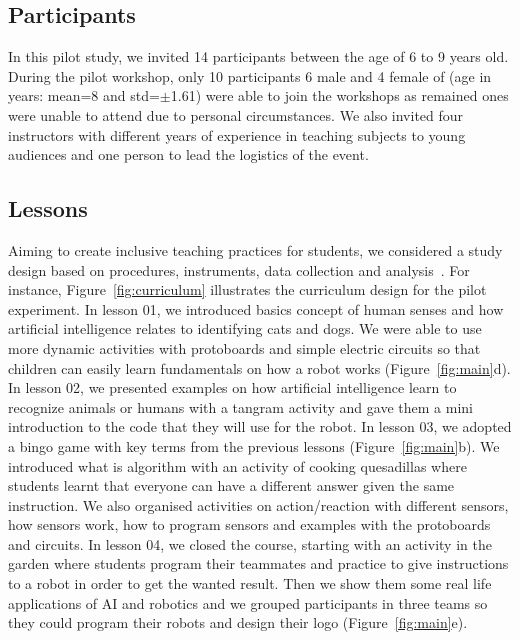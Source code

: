 \documentclass[sigconf,anonymous,review]{acmart}
\begin{document}
\subsection{Participants}
In this pilot study, we invited 14 participants between the age of 6 to 9 years old. During the pilot workshop, only 10 participants 6 male and 4 female of (age in years: mean=8 and std=$\pm$1.61) were able to join the workshops as remained ones 
  were unable to attend due to personal circumstances. We also invited four instructors with different years of experience in teaching subjects to young audiences and one person to lead the logistics of the event. 

\subsection{Lessons}
Aiming to create inclusive teaching practices for students, we considered a study design based on procedures, instruments,  data collection and analysis~\cite{du2022}.
For instance, Figure~\ref{fig:curriculum} illustrates the curriculum design for the pilot experiment. 
In lesson 01, we introduced basics concept of human senses and how artificial intelligence relates to identifying cats and dogs. We were able to use more dynamic activities with protoboards and simple electric circuits so that children can easily learn fundamentals on how a robot works (Figure~\ref{fig:main}d). 
In lesson 02, we presented examples on how artificial intelligence learn to recognize animals or humans with a tangram activity and gave them a mini introduction to the code that they will use for the robot.
In lesson 03, we adopted a bingo game with key terms from the previous lessons (Figure~\ref{fig:main}b). We 
introduced what is algorithm with an activity of cooking quesadillas where students learnt that everyone can have a different answer given the same instruction.
We also organised activities on action/reaction with different sensors, how sensors work, how to program sensors and examples with the protoboards and circuits.
In lesson 04, we closed the course, starting with an activity in the garden where students program their teammates and practice to give instructions to a robot in order to get the wanted result. Then we show them some real life applications of AI and robotics and we grouped participants in three teams so they could program their robots and design their logo (Figure~\ref{fig:main}e). 
\end{document}
